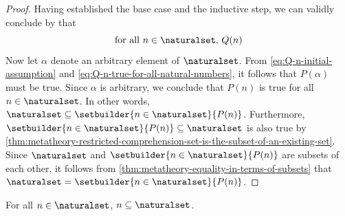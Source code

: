 \begin{proof}
    Having established the base case and the inductive step, we can validly conclude by  that
    \begin{equation}
        \label{eq:Q-n-true-for-all-natural-numbers}
        \text{for all \( n \in \naturalset \), \( Q(n) \)}
    \end{equation}
    Now let \( \alpha \) denote an arbitrary element of \( \naturalset \). From \eqref{eq:Q-n-initial-assumption} and \eqref{eq:Q-n-true-for-all-natural-numbers},
    it follows that \( P(\alpha) \) must be true.
    Since \( \alpha \) is arbitrary, we conclude that \( P(n) \) is true for all \( n \in \naturalset \). In other words,
    \( \naturalset \subseteq \setbuilder{n \in \naturalset}{P(n)} \).
    Furthermore, \( \setbuilder{n \in \naturalset}{P(n)} \subseteq \naturalset \) is also true
    by \cref{thm:metatheory-restricted-comprehension-set-is-the-subset-of-an-existing-set}.
    Since \( \naturalset \) and \( \setbuilder{n \in \naturalset}{P(n)} \) are subsets of each other, it follows from
    \cref{thm:metatheory-equality-in-terms-of-subsets} that \( \naturalset = \setbuilder{n \in \naturalset}{P(n)} \).
\end{proof}

\begin{thm}
     \label{thm:metatheory-every-natural-number-is-a-subset-of-N}
    For all \( n \in \naturalset \), \( n \subseteq \naturalset \).
\end{thm}

